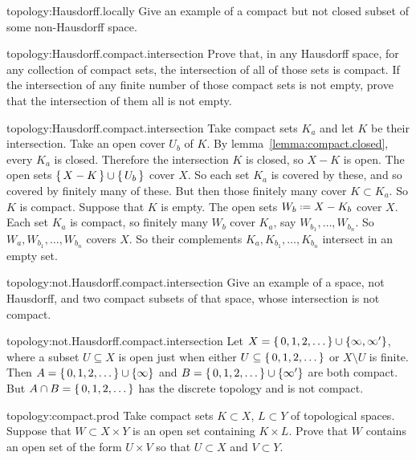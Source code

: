 \begin{problem}{topology:Hausdorff.locally}
Give an example of a compact but not closed subset of some non-Hausdorff space.
\end{problem}
\begin{problem}{topology:Hausdorff.compact.intersection}
Prove that, in any Hausdorff space, for any collection of compact sets, the intersection of all of those sets is compact.
If the intersection of any finite number of those compact sets is not empty, prove that the intersection of them all is not empty.
\end{problem}
\begin{answer}{topology:Hausdorff.compact.intersection}
Take compact sets \(K_a\) and let \(K\) be their intersection.
Take an open cover \(U_b\) of \(K\).
By lemma~\vref{lemma:compact.closed}, every \(K_a\) is closed.
Therefore the intersection \(K\) is closed, so \(X-K\) is open.
The open sets \(\set{X-K} \cup \set{U_b}\) cover \(X\).
So each set \(K_a\) is covered by these, and so covered by finitely many of these.
But then those finitely many cover \(K \subset K_a\).
So \(K\) is compact.
Suppose that \(K\) is empty.
The open sets \(W_b \defeq X-K_b\) cover \(X\).
Each set \(K_a\) is compact, so finitely many \(W_b\) cover \(K_a\), say \(W_{b_1}, \dots, W_{b_n}\).
So \(W_a, W_{b_1}, \dots, W_{b_n}\) covers \(X\).
So their complements \(K_a, K_{b_1},\dots,K_{b_n}\) intersect in an empty set.
\end{answer}
\begin{problem}{topology:not.Hausdorff.compact.intersection}
Give an example of a space, not Hausdorff, and two compact subsets of that space, whose intersection is not compact.
\end{problem}
\begin{answer}{topology:not.Hausdorff.compact.intersection}
Let \(X=\set{0,1,2,\dots}\cup\{\infty,\infty'\}\), where a subset \(U\subseteq X\) is open just when either \(U\subseteq\set{0,1,2,\dots}\) or \(X\setminus U\) is finite.  Then \(A=\set{0,1,2,\dots}\cup\{\infty\}\) and \(B=\set{0,1,2,\dots}\cup\{\infty'\}\) are both compact. 
But \(A\cap B=\set{0,1,2,\dots}\) has the discrete topology and is not compact.
\end{answer}
\begin{problem}{topology:compact.prod}
Take compact sets \(K \subset X\), \(L \subset Y\) of topological spaces.
Suppose that \(W \subset X \times Y\) is an open set containing \(K \times L\).
Prove that \(W\) contains an open set of the form \(U \times V\) so that \(U \subset X\) and \(V \subset Y\).
\end{problem}

